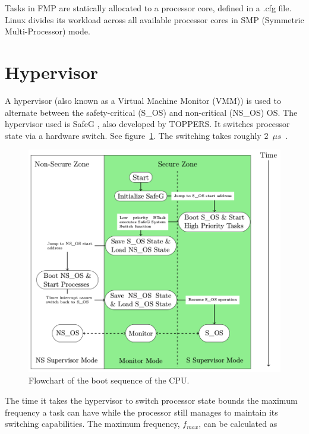 Tasks in FMP are statically allocated to a processor core, defined in a .cfg file. Linux divides its workload across all available processor cores in SMP (Symmetric Multi-Processor) mode.

\section{Hypervisor}

A hypervisor (also known as a Virtual Machine Monitor (VMM)) is used to alternate between the safety-critical (S\_OS) and non-critical (NS\_OS) OS. The hypervisor used is SafeG \cite{website:safeg}, also developed by TOPPERS. It switches processor state via a hardware switch. See figure~\ref{fig:modeswitch}. The switching takes roughly 2~$\mu s$~\cite{safegswitch}.

\begin{figure}[H]
\centering
\includegraphics[width=\textwidth]{./img/literature_modeswitch.png}
\caption{Flowchart of the boot sequence of the CPU. \cite{zaki2016}}\label{fig:modeswitch}
\end{figure}

The time it takes the hypervisor to switch processor state bounds the maximum frequency a task can have while the processor still manages to maintain its switching capabilities. The maximum frequency, $f_{max}$, can be calculated as

